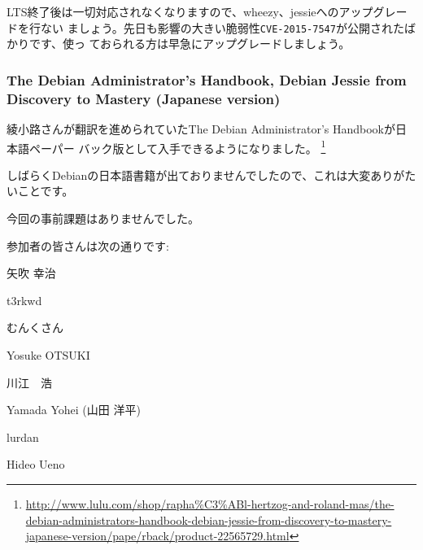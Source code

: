 \documentclass[mingoth,a4paper]{jsarticle}
\begin{document}
LTS終了後は一切対応されなくなりますので、wheezy、jessieへのアップグレードを行ない
ましょう。先日も影響の大きい脆弱性{\tt CVE-2015-7547}が公開されたばかりです、使っ
ておられる方は早急にアップグレードしましょう。

\subsubsection {The Debian Administrator's Handbook, Debian Jessie from Discovery to Mastery (Japanese version)}

綾小路さんが翻訳を進められていたThe Debian Administrator's Handbookが日本語ペーパー
バック版として入手できるようになりました。
\footnote{\url{http://www.lulu.com/shop/rapha\%C3\%ABl-hertzog-and-roland-mas/the-debian-administrators-handbook-debian-jessie-from-discovery-to-mastery-japanese-version/pape/rback/product-22565729.html}}

しばらくDebianの日本語書籍が出ておりませんでしたので、これは大変ありがたいことです。


今回の事前課題はありませんでした。

参加者の皆さんは次の通りです:

\begin{prework}{ 矢吹 幸治 }
\end{prework}

\begin{prework}{ t3rkwd }
\end{prework}

\begin{prework}{ むんくさん }
\end{prework}

\begin{prework}{ Yosuke OTSUKI }
\end{prework}

\begin{prework}{ 川江　浩 }
\end{prework}

\begin{prework}{ Yamada Yohei (山田 洋平) }
\end{prework}

\begin{prework}{ lurdan }
\end{prework}

\begin{prework}{ Hideo Ueno }
\end{prework}
\end{document}
